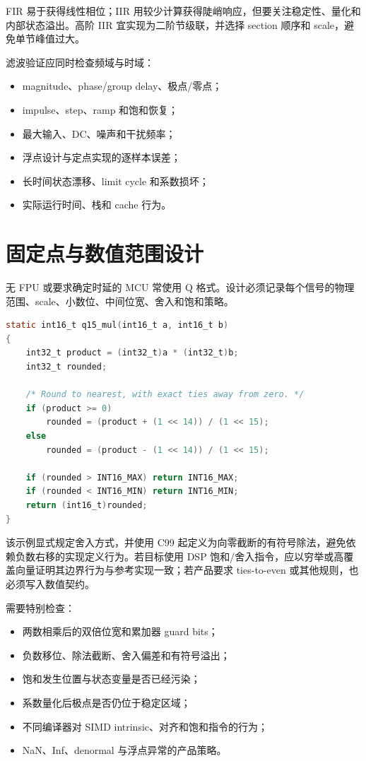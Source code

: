 FIR 易于获得线性相位；IIR 用较少计算获得陡峭响应，但要关注稳定性、量化和内部状态溢出。高阶 IIR 宜实现为二阶节级联，并选择 section 顺序和 scale，避免单节峰值过大。

滤波验证应同时检查频域与时域：

\begin{itemize}
  \item magnitude、phase/group delay、极点/零点；
  \item impulse、step、ramp 和饱和恢复；
  \item 最大输入、DC、噪声和干扰频率；
  \item 浮点设计与定点实现的逐样本误差；
  \item 长时间状态漂移、limit cycle 和系数损坏；
  \item 实际运行时间、栈和 cache 行为。
\end{itemize}

\section{固定点与数值范围设计}

无 FPU 或要求确定时延的 MCU 常使用 Q 格式。设计必须记录每个信号的物理范围、scale、小数位、中间位宽、舍入和饱和策略。

\begin{lstlisting}[language=C,caption={带舍入和饱和的 Q15 乘法}]
static int16_t q15_mul(int16_t a, int16_t b)
{
    int32_t product = (int32_t)a * (int32_t)b;
    int32_t rounded;

    /* Round to nearest, with exact ties away from zero. */
    if (product >= 0)
        rounded = (product + (1 << 14)) / (1 << 15);
    else
        rounded = (product - (1 << 14)) / (1 << 15);

    if (rounded > INT16_MAX) return INT16_MAX;
    if (rounded < INT16_MIN) return INT16_MIN;
    return (int16_t)rounded;
}
\end{lstlisting}

该示例显式规定舍入方式，并使用 C99 起定义为向零截断的有符号除法，避免依赖负数右移的实现定义行为。若目标使用 DSP 饱和/舍入指令，应以穷举或高覆盖向量证明其边界行为与参考实现一致；若产品要求 ties-to-even 或其他规则，也必须写入数值契约。

需要特别检查：

\begin{itemize}
  \item 两数相乘后的双倍位宽和累加器 guard bits；
  \item 负数移位、除法截断、舍入偏差和有符号溢出；
  \item 饱和发生位置与状态变量是否已经污染；
  \item 系数量化后极点是否仍位于稳定区域；
  \item 不同编译器对 SIMD intrinsic、对齐和饱和指令的行为；
  \item NaN、Inf、denormal 与浮点异常的产品策略。
\end{itemize}

